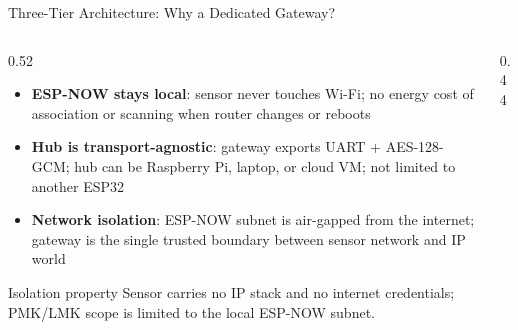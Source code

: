 \begin{frame}[shrink=25]{Three-Tier Architecture: Why a Dedicated Gateway?}
\begin{columns}[T,onlytextwidth]
\begin{column}{0.52\textwidth}
  \begin{itemize}\setlength\itemsep{3pt}
    \item \textbf{ESP-NOW stays local}: sensor never touches Wi-Fi; no energy cost of association or scanning when router changes or reboots
    \item \textbf{Hub is transport-agnostic}: gateway exports UART + AES-128-GCM; hub can be Raspberry Pi, laptop, or cloud VM; not limited to another ESP32
    \item \textbf{Network isolation}: ESP-NOW subnet is air-gapped from the internet; gateway is the single trusted boundary between sensor network and IP world
  \end{itemize}
  \vspace{0.1cm}
  \begin{block}{Isolation property}
  \scriptsize Sensor carries no IP stack and no internet credentials; PMK/LMK scope is limited to the local ESP-NOW subnet.
  \end{block}
\end{column}
\begin{column}{0.44\textwidth}
\centering
{}
\end{column}
\end{columns}
\end{frame}
